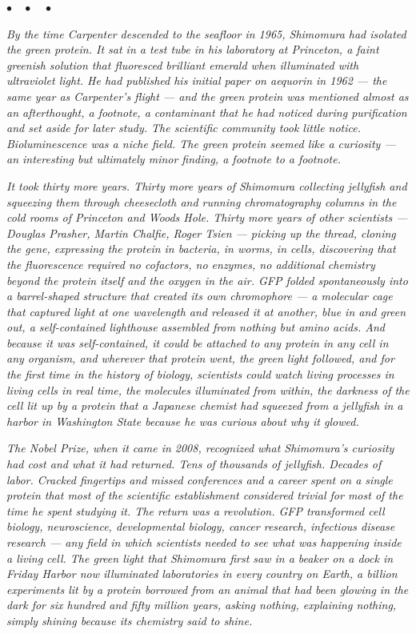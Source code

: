 \documentclass[12pt, letterpaper]{article}
\begin{document}
\begin{center}
$\bullet\quad\bullet\quad\bullet$
\end{center}

\emph{By the time Carpenter descended to the seafloor in 1965, Shimomura had isolated the green protein. It sat in a test tube in his laboratory at Princeton, a faint greenish solution that fluoresced brilliant emerald when illuminated with ultraviolet light. He had published his initial paper on aequorin in 1962 --- the same year as Carpenter's flight --- and the green protein was mentioned almost as an afterthought, a footnote, a contaminant that he had noticed during purification and set aside for later study. The scientific community took little notice. Bioluminescence was a niche field. The green protein seemed like a curiosity --- an interesting but ultimately minor finding, a footnote to a footnote.}

\emph{It took thirty more years. Thirty more years of Shimomura collecting jellyfish and squeezing them through cheesecloth and running chromatography columns in the cold rooms of Princeton and Woods Hole. Thirty more years of other scientists --- Douglas Prasher, Martin Chalfie, Roger Tsien --- picking up the thread, cloning the gene, expressing the protein in bacteria, in worms, in cells, discovering that the fluorescence required no cofactors, no enzymes, no additional chemistry beyond the protein itself and the oxygen in the air. GFP folded spontaneously into a barrel-shaped structure that created its own chromophore --- a molecular cage that captured light at one wavelength and released it at another, blue in and green out, a self-contained lighthouse assembled from nothing but amino acids. And because it was self-contained, it could be attached to any protein in any cell in any organism, and wherever that protein went, the green light followed, and for the first time in the history of biology, scientists could watch living processes in living cells in real time, the molecules illuminated from within, the darkness of the cell lit up by a protein that a Japanese chemist had squeezed from a jellyfish in a harbor in Washington State because he was curious about why it glowed.}

\emph{The Nobel Prize, when it came in 2008, recognized what Shimomura's curiosity had cost and what it had returned. Tens of thousands of jellyfish. Decades of labor. Cracked fingertips and missed conferences and a career spent on a single protein that most of the scientific establishment considered trivial for most of the time he spent studying it. The return was a revolution. GFP transformed cell biology, neuroscience, developmental biology, cancer research, infectious disease research --- any field in which scientists needed to see what was happening inside a living cell. The green light that Shimomura first saw in a beaker on a dock in Friday Harbor now illuminated laboratories in every country on Earth, a billion experiments lit by a protein borrowed from an animal that had been glowing in the dark for six hundred and fifty million years, asking nothing, explaining nothing, simply shining because its chemistry said to shine.}
\end{document}
